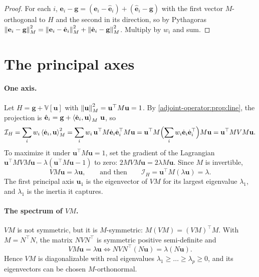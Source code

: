 \begin{notechapter}
\begin{proof}
For each $i$, $\mathbf e_i - \mathbf g = (\mathbf e_i - \hat{\mathbf e}_i) + (\hat{\mathbf e}_i - \mathbf g)$ with the first vector
$M$-orthogonal to $H$ and the second in its direction, so by Pythagoras
$\left\|\mathbf e_i - \mathbf g\right\|_M^2 = \left\|\mathbf e_i - \hat{\mathbf e}_i\right\|_M^2 + \left\|\hat{\mathbf e}_i - \mathbf g\right\|_M^2$. Multiply by $w_i$ and sum.
\end{proof}

\section{The principal axes}\label{pca-overview:sec:axes}

\paragraph{One axis.} Let $H = \mathbf g + \mathbb V[\mathbf u]$ with $\left\|\mathbf u\right\|_M^2 = \mathbf u^\top M\mathbf u = 1$. By
\cref{adjoint-operator:prop:line}, the projection is $\hat{\mathbf e}_i = \mathbf g + \left\langle \dot{\mathbf e}_i, \mathbf u \right\rangle_M\,\mathbf u$, so
\[
  \mathcal I_H = \sum_iw_i\left\langle \dot{\mathbf e}_i, \mathbf u \right\rangle_M^2
  = \sum_iw_i\,\mathbf u^\top M\dot{\mathbf e}_i\dot{\mathbf e}_i^\top M\mathbf u
  = \mathbf u^\top M\Bigl(\sum_iw_i\dot{\mathbf e}_i\dot{\mathbf e}_i^\top\Bigr)M\mathbf u
  = \mathbf u^\top MVM\mathbf u .
\]
To maximize it under $\mathbf u^\top M\mathbf u = 1$, set the gradient of the Lagrangian
$\mathbf u^\top MVM\mathbf u - \lambda(\mathbf u^\top M\mathbf u - 1)$ to zero: $2MVM\mathbf u = 2\lambda M\mathbf u$. Since $M$ is
invertible,
\[
  VM\mathbf u = \lambda\mathbf u,\qquad\text{and then}\qquad\mathcal I_H = \mathbf u^\top M(\lambda\mathbf u) = \lambda .
\]
The first principal axis $\mathbf u_1$ is the eigenvector of $VM$ for its largest eigenvalue
$\lambda_1$, and $\lambda_1$ is the inertia it captures.

\paragraph{The spectrum of $VM$.} $VM$ is not symmetric, but it is $M$-symmetric:
$M(VM) = (VM)^\top M$. With $M = N^\top N$, the matrix $NVN^\top$ is symmetric positive semi-definite and
\[
  VM\mathbf u = \lambda\mathbf u\iff NVN^\top(N\mathbf u) = \lambda(N\mathbf u).
\]
Hence $VM$ is diagonalizable with real eigenvalues $\lambda_1\geq\dots\geq\lambda_p\geq0$, and its
eigenvectors can be chosen $M$-orthonormal.


\end{notechapter}
